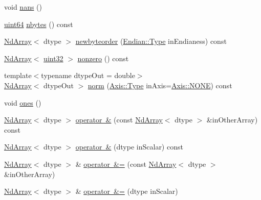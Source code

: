 \begin{DoxyCompactItemize}
\item 
void \mbox{\hyperlink{class_num_c_1_1_nd_array_ad218314b7efa61051b2bbcf683d19354}{nans}} ()
\item 
\mbox{\hyperlink{namespace_num_c_a22306a0884a815781c5b147415f6d817}{uint64}} \mbox{\hyperlink{class_num_c_1_1_nd_array_a68b69a2bce03b4a10961c51fff965522}{nbytes}} () const
\item 
\mbox{\hyperlink{class_num_c_1_1_nd_array}{Nd\+Array}}$<$ dtype $>$ \mbox{\hyperlink{class_num_c_1_1_nd_array_a992b403fa64d2d3c4516b0ca9328de66}{newbyteorder}} (\mbox{\hyperlink{struct_num_c_1_1_endian_ab667001489f67f8a96f328f0a9c351fa}{Endian\+::\+Type}} in\+Endianess) const
\item 
\mbox{\hyperlink{class_num_c_1_1_nd_array}{Nd\+Array}}$<$ \mbox{\hyperlink{namespace_num_c_ae685802ca6d3035f2b400b081e3953fa}{uint32}} $>$ \mbox{\hyperlink{class_num_c_1_1_nd_array_aa0a3b09f956b37105f51728f43fedc75}{nonzero}} () const
\item 
{\footnotesize template$<$typename dtype\+Out  = double$>$ }\\\mbox{\hyperlink{class_num_c_1_1_nd_array}{Nd\+Array}}$<$ dtype\+Out $>$ \mbox{\hyperlink{class_num_c_1_1_nd_array_a47c3cf20b6d6c9836c8f44cd20db19a2}{norm}} (\mbox{\hyperlink{struct_num_c_1_1_axis_a8e689044ef1941a03482e730c5e7ebb3}{Axis\+::\+Type}} in\+Axis=\mbox{\hyperlink{struct_num_c_1_1_axis_a8e689044ef1941a03482e730c5e7ebb3a0ae033c4226f7184bf0050b101e7ed94}{Axis\+::\+N\+O\+NE}}) const
\item 
void \mbox{\hyperlink{class_num_c_1_1_nd_array_aad4dd497617c112f0651c063101abf3f}{ones}} ()
\item 
\mbox{\hyperlink{class_num_c_1_1_nd_array}{Nd\+Array}}$<$ dtype $>$ \mbox{\hyperlink{class_num_c_1_1_nd_array_a1e12ef0c840772a2d180cdf679b81297}{operator \&}} (const \mbox{\hyperlink{class_num_c_1_1_nd_array}{Nd\+Array}}$<$ dtype $>$ \&in\+Other\+Array) const
\item 
\mbox{\hyperlink{class_num_c_1_1_nd_array}{Nd\+Array}}$<$ dtype $>$ \mbox{\hyperlink{class_num_c_1_1_nd_array_ad45f32f0f838dd0eba65a867b7066b61}{operator \&}} (dtype in\+Scalar) const
\item 
\mbox{\hyperlink{class_num_c_1_1_nd_array}{Nd\+Array}}$<$ dtype $>$ \& \mbox{\hyperlink{class_num_c_1_1_nd_array_ab80433168fc9b6c44e49f68688826802}{operator \&=}} (const \mbox{\hyperlink{class_num_c_1_1_nd_array}{Nd\+Array}}$<$ dtype $>$ \&in\+Other\+Array)
\item 
\mbox{\hyperlink{class_num_c_1_1_nd_array}{Nd\+Array}}$<$ dtype $>$ \& \mbox{\hyperlink{class_num_c_1_1_nd_array_aa7d1db0e3ce1e1ac3697bde5bb61dbd5}{operator \&=}} (dtype in\+Scalar)

\end{DoxyCompactItemize}
